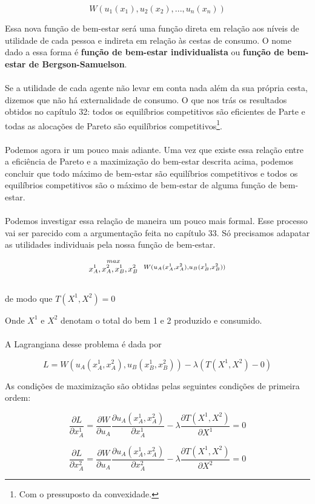 \documentclass[a4paper,11pt,oneside]{book}
\theoremstyle{definition}
\theoremstyle{break}
\begin{document}
$$ W(u_1(x_1),u_2(x_2),...,u_n(x_n)) $$

Essa nova função de bem-estar será uma função direta em relação aos níveis de utilidade de cada pessoa e indireta em relação às cestas de consumo. O nome dado a essa forma é \textbf{função de bem-estar individualista} ou \textbf{função de bem-estar de Bergson-Samuelson}.
\\
\\
Se a utilidade de cada agente não levar em conta nada além da sua própria cesta, dizemos que não há externalidade de consumo. O que nos trás os resultados obtidos no capítulo 32: todos os equilíbrios competitivos são eficientes de Parte e todas as alocações de Pareto são equilíbrios competitivos\footnote{Com o pressuposto da convexidade.}.
\\
\\
Podemos agora ir um pouco mais adiante. Uma vez que existe essa relação entre a eficiência de Pareto e a maximização do bem-estar descrita acima, podemos concluir que todo máximo de bem-estar são equilíbrios competitivos e todos os equilíbrios competitivos são o máximo de bem-estar de alguma função de bem-estar.
\\
\\
Podemos investigar essa relação de maneira um pouco mais formal. Esse processo vai ser parecido com a argumentação feita no capítulo 33. Só precisamos adapatar as utilidades individuais pela nossa função de bem-estar.

\begin{center}
	\LARGE $$ \stackrel{max}{\text{\small $x_A^1,x_A^2,x_B^1,x_B^2$}} \ \ \stackrel{W(u_A(x_A^1,x_A^2),u_B(x_B^1,x_B^2))}{\ } $$
	\\
	\normalsize de modo que $T(X^1,X^2) = 0$
\end{center}

Onde $X^1$ e $X^2$ denotam o total do bem 1 e 2 produzido e consumido.
\\
\\
A Lagrangiana desse problema é dada por

$$ L = W(u_A(x_A^1,x_A^2),u_B(x_B^1,x_B^2)) - \lambda(T(X^1,X^2) - 0) $$

As condições de maximização são obtidas pelas seguintes condições de primeira ordem:

$$ \frac{\partial L}{\partial x_A^1} = \frac{\partial W}{\partial u_A} \frac{\partial u_A(x_A^1,x_A^2)}{\partial x_A^1} - \lambda \frac{\partial T(X^1,X^2)}{\partial X^1} = 0 $$

$$ \frac{\partial L}{\partial x_A^2} = \frac{\partial W}{\partial u_A} \frac{\partial u_A(x_A^1,x_A^2)}{\partial x_A^2} - \lambda \frac{\partial T(X^1,X^2)}{\partial X^2} = 0 $$
\end{document}
